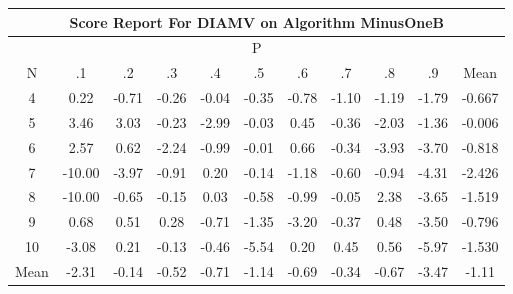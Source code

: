 \documentclass[11pt,a4paper]{report}
\begin{document}
\begin{longtable}{ | c || c | c | c | c | c | c | c | c | c || c |}
\hline
\multicolumn{11}{|c|}{ Score Report For DIAMV on Algorithm MinusOneB} \\
\hline
\multicolumn{11}{|c|}{ P } \\
\hline
N & .1 & .2 & .3 & .4 & .5 & .6 & .7 & .8 & .9 & Mean\\
 \hline
 \hline
 \endhead
  4 &  \cellcolor[HTML]{F7F7FF} 0.22 &  \cellcolor[HTML]{FFEFEF} -0.71 &  \cellcolor[HTML]{FFF7F7} -0.26 &  \cellcolor[HTML]{FFFFFF} -0.04 &  \cellcolor[HTML]{FFF7F7} -0.35 &  \cellcolor[HTML]{FFEFEF} -0.78 &  \cellcolor[HTML]{FFE7E7} -1.10 &  \cellcolor[HTML]{FFDFDF} -1.19 &  \cellcolor[HTML]{FFCFCF} -1.79 & -0.667 \\
  5 &  \cellcolor[HTML]{A7A7FF} 3.46 &  \cellcolor[HTML]{AFAFFF} 3.03 &  \cellcolor[HTML]{FFF7F7} -0.23 &  \cellcolor[HTML]{FFB7B7} -2.99 &  \cellcolor[HTML]{FFFFFF} -0.03 &  \cellcolor[HTML]{F7F7FF} 0.45 &  \cellcolor[HTML]{FFF7F7} -0.36 &  \cellcolor[HTML]{FFCFCF} -2.03 &  \cellcolor[HTML]{FFDFDF} -1.36 & -0.006 \\
  6 &  \cellcolor[HTML]{BFBFFF} 2.57 &  \cellcolor[HTML]{EFEFFF} 0.62 &  \cellcolor[HTML]{FFC7C7} -2.24 &  \cellcolor[HTML]{FFE7E7} -0.99 &  \cellcolor[HTML]{FFFFFF} -0.01 &  \cellcolor[HTML]{EFEFFF} 0.66 &  \cellcolor[HTML]{FFF7F7} -0.34 &  \cellcolor[HTML]{FF9F9F} -3.93 &  \cellcolor[HTML]{FF9F9F} -3.70 & -0.818 \\
  7 &  \cellcolor[HTML]{FF0000} -10.00 &  \cellcolor[HTML]{FF9F9F} -3.97 &  \cellcolor[HTML]{FFE7E7} -0.91 &  \cellcolor[HTML]{F7F7FF} 0.20 &  \cellcolor[HTML]{FFFFFF} -0.14 &  \cellcolor[HTML]{FFDFDF} -1.18 &  \cellcolor[HTML]{FFEFEF} -0.60 &  \cellcolor[HTML]{FFE7E7} -0.94 &  \cellcolor[HTML]{FF8F8F} -4.31 & -2.426 \\
  8 &  \cellcolor[HTML]{FF0000} -10.00 &  \cellcolor[HTML]{FFEFEF} -0.65 &  \cellcolor[HTML]{FFFFFF} -0.15 &  \cellcolor[HTML]{FFFFFF} 0.03 &  \cellcolor[HTML]{FFEFEF} -0.58 &  \cellcolor[HTML]{FFE7E7} -0.99 &  \cellcolor[HTML]{FFFFFF} -0.05 &  \cellcolor[HTML]{C7C7FF} 2.38 &  \cellcolor[HTML]{FF9F9F} -3.65 & -1.519 \\
  9 &  \cellcolor[HTML]{EFEFFF} 0.68 &  \cellcolor[HTML]{EFEFFF} 0.51 &  \cellcolor[HTML]{F7F7FF} 0.28 &  \cellcolor[HTML]{FFEFEF} -0.71 &  \cellcolor[HTML]{FFDFDF} -1.35 &  \cellcolor[HTML]{FFAFAF} -3.20 &  \cellcolor[HTML]{FFF7F7} -0.37 &  \cellcolor[HTML]{EFEFFF} 0.48 &  \cellcolor[HTML]{FFA7A7} -3.50 & -0.796 \\
  10 &  \cellcolor[HTML]{FFAFAF} -3.08 &  \cellcolor[HTML]{F7F7FF} 0.21 &  \cellcolor[HTML]{FFFFFF} -0.13 &  \cellcolor[HTML]{FFF7F7} -0.46 &  \cellcolor[HTML]{FF7878} -5.54 &  \cellcolor[HTML]{F7F7FF} 0.20 &  \cellcolor[HTML]{F7F7FF} 0.45 &  \cellcolor[HTML]{EFEFFF} 0.56 &  \cellcolor[HTML]{FF6868} -5.97 & -1.530 \\
 \hline
 \hline
Mean &  \cellcolor[HTML]{FFC7C7} -2.31 &  \cellcolor[HTML]{FFFFFF} -0.14 &  \cellcolor[HTML]{FFEFEF} -0.52 &  \cellcolor[HTML]{FFEFEF} -0.71 &  \cellcolor[HTML]{FFDFDF} -1.14 &  \cellcolor[HTML]{FFEFEF} -0.69 &  \cellcolor[HTML]{FFF7F7} -0.34 &  \cellcolor[HTML]{FFEFEF} -0.67 &  \cellcolor[HTML]{FFA7A7} -3.47 &  \cellcolor[HTML]{FFE7E7} -1.11
\end{longtable}
\end{document}
